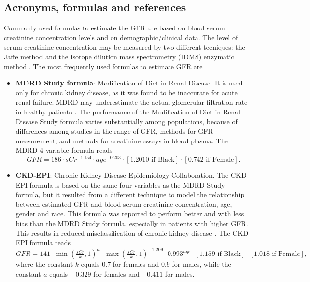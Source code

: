\documentclass[10pt,final]{siamltex}
\begin{document}
\subsection{Acronyms, formulas and references}
%
Commonly used formulas to estimate the GFR are based on blood serum creatinine concentration levels and on demographic/clinical data. The level of serum creatinine concentration may be measured by two different tecniques: the Jaffe  method \cite{jaffe} and the isotope dilution mass spectrometry (IDMS) enzymatic method \cite{idms}. The most frequently used formulas to estimate GFR are
%
\begin{itemize}
  \item \textbf{MDRD Study formula}: Modification of Diet in Renal Disease. It is used only for chronic kidney disease, as it was found to be inaccurate for acute renal failure. MDRD may underestimate the actual glomerular filtration rate in healthy patients \cite{MDRD,mayo}. The performance of the Modification of Diet in Renal Disease Study formula varies substantially among populations, because of differences among studies in the range of GFR, methods for GFR measurement, and methods for creatinine assays in blood plasma. The MDRD 4-variable formula reads
  \begin{equation}
    \mathit{GFR} = 186 \cdot sCr^{-1.154}\cdot age^{-0.203} \cdot [1.2010 \text{ if Black}] \cdot [0.742 \text{ if Female}].
  \end{equation}

  \item \textbf{CKD-EPI}: Chronic Kidney Disease Epidemiology Collaboration. The CKD-EPI formula is based on the same four variables as the MDRD Study formula, but it resulted from a different technique to model the relationship between estimated GFR and blood serum creatinine concentration, age, gender and race. This formula was reported to perform better and with less bias than the MDRD Study formula, especially in patients with higher GFR. This results in reduced misclassification of chronic kidney disease \cite{ckdepi}. The CKD-EPI formula reads
  \begin{equation}
    \mathit{GFR} =141 \cdot \min\left(\tfrac{sCr}{k},1\right)^a\cdot \max\left(\tfrac{sCr}{k},1\right)^{-1.209}\cdot0.993^{age} \cdot [1.159 \text{ if Black}] \cdot [1.018 \text{ if Female}],
  \end{equation}
  where the constant $k$ equals $0.7$ for females and $0.9$ for males, while the constant $a$ equals $−0.329$ for females and $−0.411$ for males.


\end{itemize}
\end{document}
